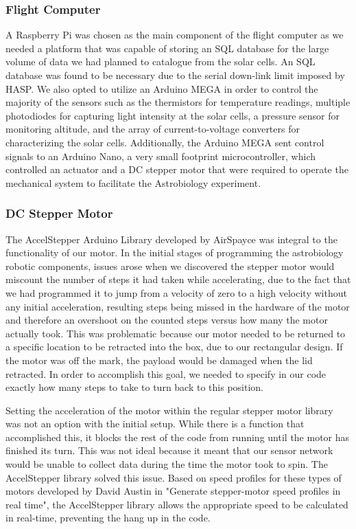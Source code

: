 \subsubsection{Flight Computer}
A Raspberry Pi was chosen as the main component of the flight computer as we needed a platform that was capable of storing an SQL database for the large volume of data we had planned to catalogue from the solar cells. An SQL database was found to be necessary due to the serial down-link limit imposed by HASP. We also opted to utilize an Arduino MEGA in order to control the majority of the sensors such as the thermistors for temperature readings, multiple photodiodes for capturing light intensity at the solar cells, a pressure sensor for monitoring altitude, and the array of current-to-voltage converters for characterizing the solar cells. Additionally, the Arduino MEGA sent control signals to an Arduino Nano, a very small footprint microcontroller, which controlled an actuator and a DC stepper motor that were required to operate the mechanical system to facilitate the Astrobiology experiment.


\subsubsection{DC Stepper Motor}
The AccelStepper Arduino Library developed by AirSpayce \cite{AccelStepper} was integral to the functionality of our motor.
In the initial stages of programming the astrobiology robotic components, issues arose when we discovered the stepper motor would miscount the number of steps it had taken while accelerating, due to the fact that we had programmed it to jump from a velocity of zero to a high velocity without any initial acceleration, resulting steps being missed in the hardware of the motor and therefore an overshoot on the counted steps versus how many the motor actually took.
This was problematic because our motor needed to be returned to a specific location to be retracted into the box, due to our rectangular design.
If the motor was off the mark, the payload would be damaged when the lid retracted.
In order to accomplish this goal, we needed to specify in our code exactly how many steps to take to turn back to this position.

Setting the acceleration of the motor within the regular stepper motor library was not an option with the initial setup.
While there is a function that accomplished this, it blocks the rest of the code from running until the motor has finished its turn.
This was not ideal because it meant that our sensor network would be unable to collect data during the time the motor took to spin. The AccelStepper library solved this issue.
Based on speed profiles for these types of motors developed by David Austin in "Generate stepper-motor speed profiles in real time", the AccelStepper library allows the appropriate speed to be calculated in real-time, preventing the hang up in the code. 


